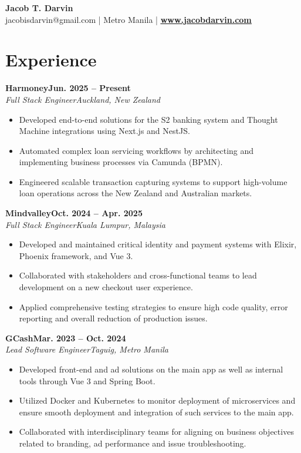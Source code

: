 \documentclass[letterpaper,11pt]{article}
\newcommand{\cvlink}[2]{\href{#1}{\textcolor{linkblue}{\uline{\textbf{#2}}}}}
\newcommand{\entry}[4]{%
  \textbf{#1}\hfill\textbf{#2}\\
  \textit{#3}\hfill\textit{#4}\par
}
\newcommand{\entrygap}{\vspace{10pt}}
\begin{document}
{\fontsize{24}{28}\selectfont\bfseries Jacob T. Darvin}\\[3pt]
jacobisdarvin@gmail.com \;|\; Metro Manila \;|\;
\cvlink{https://jacobdarvin.com}{www.jacobdarvin.com}

\section{Experience}

\entry{Harmoney}{Jun. 2025 -- Present}{Full Stack Engineer}{Auckland, New Zealand}
\begin{itemize}
  \item Developed end-to-end solutions for the S2 banking system and Thought Machine integrations using Next.js and NestJS.
  \item Automated complex loan servicing workflows by architecting and implementing business processes via Camunda (BPMN).
  \item Engineered scalable transaction capturing systems to support high-volume loan operations across the New Zealand and Australian markets.
\end{itemize}
\entrygap

\entry{Mindvalley}{Oct. 2024 -- Apr. 2025}{Full Stack Engineer}{Kuala Lumpur, Malaysia}
\begin{itemize}
  \item Developed and maintained critical identity and payment systems with Elixir, Phoenix framework, and Vue 3.
  \item Collaborated with stakeholders and cross-functional teams to lead development on a new checkout user experience.
  \item Applied comprehensive testing strategies to ensure high code quality, error reporting and overall reduction of production issues.
\end{itemize}
\entrygap

\entry{GCash}{Mar. 2023 -- Oct. 2024}{Lead Software Engineer}{Taguig, Metro Manila}
\begin{itemize}
  \item Developed front-end and ad solutions on the main app as well as internal tools through Vue 3 and Spring Boot.
  \item Utilized Docker and Kubernetes to monitor deployment of microservices and ensure smooth deployment and integration of such services to the main app.
  \item Collaborated with interdisciplinary teams for aligning on business objectives related to branding, ad performance and issue troubleshooting.
\end{itemize}
\entrygap
\end{document}
